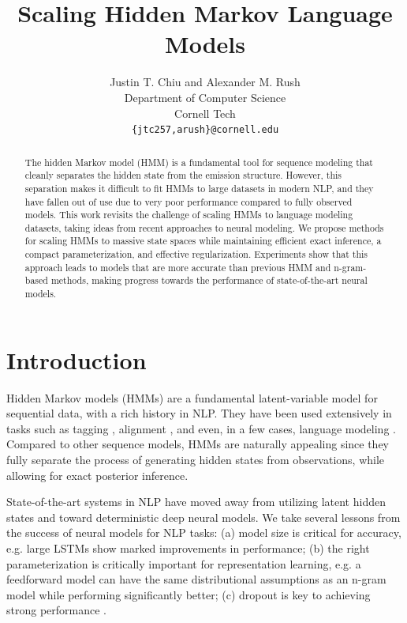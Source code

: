 \documentclass[11pt,a4paper]{article}
\title{Scaling Hidden Markov Language Models}
\author{Justin T. Chiu {\normalfont and} Alexander M. Rush\\
  Department of Computer Science \\
  Cornell Tech \\
  \texttt{\{jtc257,arush\}@cornell.edu}\\}
\date{}
\makeatletter
\def\blfootnote{\xdef\@thefnmark{}\@footnotetext}
\makeatother
\begin{document}
\maketitle
\begin{abstract}
The hidden Markov model (HMM) is a fundamental tool for sequence modeling that 
cleanly separates the hidden state from the emission structure.
However, this separation makes it difficult to fit HMMs to large datasets in modern NLP, 
and they have fallen out of use due to very poor performance 
compared to fully observed models. This work revisits the challenge of 
scaling HMMs to language modeling datasets,
taking ideas from recent approaches to neural modeling.
We propose methods for scaling HMMs to massive state spaces
while maintaining efficient exact inference, a compact parameterization,
and effective regularization.
Experiments show that this approach leads to models that are more accurate
than previous HMM and n-gram-based methods,
making progress towards the performance of state-of-the-art neural models.
\end{abstract}


\section{Introduction}
Hidden Markov models (HMMs) are a fundamental latent-variable model for sequential data,
with a rich history in NLP.
They have been used extensively in tasks such as
tagging \citep{merialdo1994tagging}, alignment \citep{vogel1996hmm},
and even, in a few cases, language modeling \citep{kuhn1994hmmlm,huang2011thesis}. 
Compared to other sequence models, HMMs are naturally appealing since they 
fully separate the process of generating hidden states from observations,
while allowing for exact posterior inference. 

State-of-the-art systems in NLP have moved away from utilizing latent hidden states
and toward deterministic deep neural models.
We take several lessons from the success of neural models for NLP tasks:
(a) model size is critical for accuracy,
e.g. large LSTMs \cite{zaremba2014lstm} show marked improvements in performance;
(b) the right parameterization is critically important for representation learning,
e.g. a feedforward model \cite{bengio2003nlm}
can have the same distributional assumptions as an n-gram model while performing significantly better;
(c) dropout is key to achieving strong performance \citep{zaremba2014lstm,merity2017awdlstm}.
\end{document}
